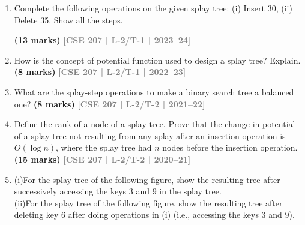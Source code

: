 \documentclass[12pt,a3paper]{article}
\newcommand{\yr}[1]{\hfill\textcolor{gray}{\small\textbf{[#1]}}}
\newcommand{\mk}[1]{\textcolor{orange!70!black}{\small\textbf{(#1 marks)}}}
\begin{document}
\begin{enumerate}

\item Complete the following operations on the given splay tree: (i) Insert 30, (ii) Delete 35. Show all the steps.
\begin{center}
\end{center}

\mk{13} \yr{CSE 207 | L-2/T-1 | 2023--24}

\item How is the concept of potential function used to design a splay tree? Explain.
\mk{8} \yr{CSE 207 | L-2/T-1 | 2022--23}

\item What are the splay-step operations to make a binary search tree a balanced one?
\mk{8} \yr{CSE 207 | L-2/T-2 | 2021--22}

\item Define the rank of a node of a splay tree. Prove that the change in potential of a splay tree not resulting from any splay after an insertion operation is $O(\log n)$, where the splay tree had $n$ nodes before the insertion operation.
\mk{15} \yr{CSE 207 | L-2/T-2 | 2020--21}

\item (i)For the splay tree of the following figure, show the resulting tree after successively accessing the keys 3 and 9 in the splay tree.
\\(ii)For the splay tree of the following figure, show the resulting tree after deleting key 6 after doing operations in (i) (i.e., accessing the keys 3 and 9).



\end{enumerate}
\end{document}
